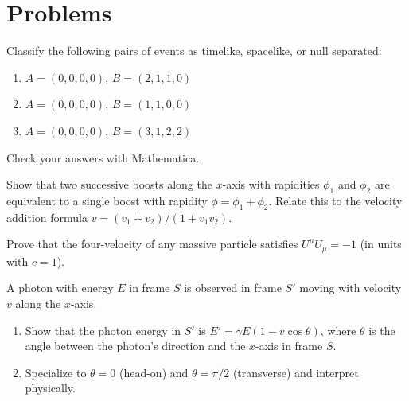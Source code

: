 \section{Problems}
\label{sec:sr_problems}

\begin{exercise}
\label{ex:interval_classification}
Classify the following pairs of events as timelike, spacelike, or null
separated:
\begin{enumerate}[label=(\alph*)]
    \item $A = (0, 0, 0, 0)$, $B = (2, 1, 1, 0)$
    \item $A = (0, 0, 0, 0)$, $B = (1, 1, 0, 0)$
    \item $A = (0, 0, 0, 0)$, $B = (3, 1, 2, 2)$
\end{enumerate}
Check your answers with Mathematica.
\end{exercise}

\begin{exercise}
\label{ex:boost_composition}
Show that two successive boosts along the $x$-axis with rapidities $\phi_1$
and $\phi_2$ are equivalent to a single boost with rapidity
$\phi = \phi_1 + \phi_2$.  Relate this to the velocity addition formula
$v = (v_1 + v_2)/(1 + v_1 v_2)$.
\end{exercise}

\begin{exercise}
\label{ex:four_velocity_norm}
Prove that the four-velocity of any massive particle satisfies
$U^\mu U_\mu = -1$ (in units with $c = 1$).
\end{exercise}

\begin{exercise}
\label{ex:photon_energy}
A photon with energy $E$ in frame $S$ is observed in frame $S'$ moving with
velocity $v$ along the $x$-axis.
\begin{enumerate}[label=(\alph*)]
    \item Show that the photon energy in $S'$ is $E' = \gamma E(1 - v\cos\theta)$,
          where $\theta$ is the angle between the photon's direction and the
          $x$-axis in frame $S$.
    \item Specialize to $\theta = 0$ (head-on) and $\theta = \pi/2$
          (transverse) and interpret physically.
\end{enumerate}
\end{exercise}


